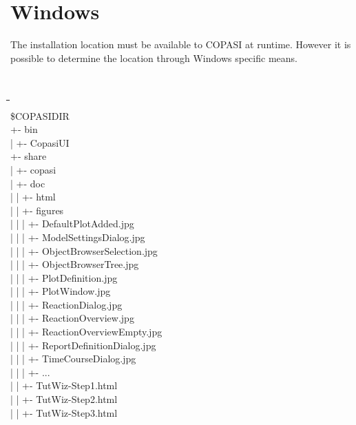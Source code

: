 \documentclass[12pt]{book}
\begin{document}
\section{Windows}
The installation location must be available to COPASI at
runtime. However it is possible to determine the location through
Windows specific means.
{\tt \scriptsize
\begin{tabbing}
 \hspace{4 pt}\=\hspace{17 pt}\=\hspace{17 pt}\=\hspace{17
 pt}\=\hspace{17 pt}\=\hspace{17 pt}\= \\ [-12 pt]
 \$COPASIDIR \\
 \> +- bin \\
 \> | \> +- CopasiUI \\
 \> +- share \\
 \> | \> +- copasi \\
 \> | \> \> +- doc \\
 \> | \> \> | \> +- html \\
 \> | \> \> | \> \> +- figures \\
 \> | \> \> | \> \> | \> +- DefaultPlotAdded.jpg \\
 \> | \> \> | \> \> | \> +- ModelSettingsDialog.jpg \\
 \> | \> \> | \> \> | \> +- ObjectBrowserSelection.jpg \\
 \> | \> \> | \> \> | \> +- ObjectBrowserTree.jpg \\
 \> | \> \> | \> \> | \> +- PlotDefinition.jpg \\
 \> | \> \> | \> \> | \> +- PlotWindow.jpg \\
 \> | \> \> | \> \> | \> +- ReactionDialog.jpg \\
 \> | \> \> | \> \> | \> +- ReactionOverview.jpg \\
 \> | \> \> | \> \> | \> +- ReactionOverviewEmpty.jpg \\
 \> | \> \> | \> \> | \> +- ReportDefinitionDialog.jpg \\
 \> | \> \> | \> \> | \> +- TimeCourseDialog.jpg \\
 \> | \> \> | \> \> | \> +- ... \\
 \> | \> \> | \> \> +- TutWiz-Step1.html \\
 \> | \> \> | \> \> +- TutWiz-Step2.html \\
 \> | \> \> | \> \> +- TutWiz-Step3.html \\

\end{tabbing}}
\end{document}
